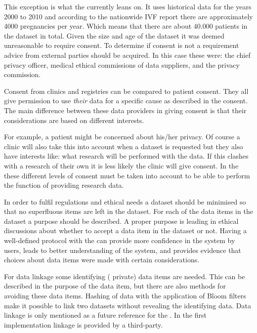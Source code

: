 This exception is what the \ivfsystem{} currently leans on. 
It uses historical data for the years 2000 to 2010 and according to the nationwide IVF report \cite{ivfReportNVOG} there are approximately 4000 pregnancies per year.
Which means that there are about 40.000 patients in the dataset in total.
Given the size and age of the dataset it was deemed unreasonable to require consent.
To determine if consent is not a requirement advice from external parties should be acquired.
In this case these were: the \AMC{} chief privacy officer, medical ethical commissions of data suppliers, and the \PRN{} privacy commission.

Consent from clinics and registries can be compared to patient consent.
They all give permission to use \emph{their} data for a specific cause as described in the consent.
The main difference between these data providers in giving consent is that their considerations are based on different interests.

For example, a patient might be concerned about his/her privacy.
Of course a clinic will also take this into account when a dataset is requested but they also have interests like: what research will be performed with the data.
If this clashes with a research of their own it is less likely the clinic will give consent.
In the \ivfsystem{} these different levels of consent must be taken into account  to be able to perform the function of providing research data.

In order to fulfil regulations and ethical needs a dataset should be minimised so that no superfluous items are left in the dataset.
For each of the data items in the dataset a purpose should be described. 
A proper purpose is leading in ethical discussions about whether to accept a data item in the dataset or not.
Having a well-defined protocol with the \ivfsystem{} can provide more confidence in the system by users, leads to better understanding of the system, and provides evidence that choices about data items were made with certain considerations.

For data linkage some identifying (\ie{} private) data items are needed.
This can be described in the purpose of the data item, but there are also methods for avoiding these data items.
Hashing of data with the application of Bloom filters make it possible to link two datasets without revealing the identifying data.
Data linkage is only mentioned as a future reference for the \ivfsystem{}.
In the first implementation linkage is provided by a third-party.


